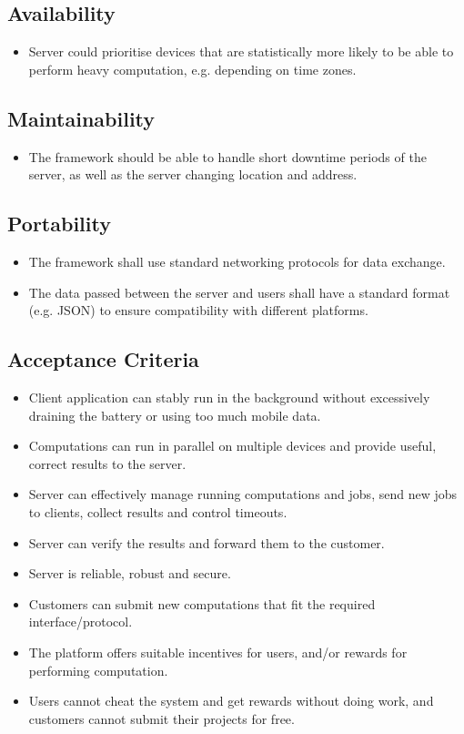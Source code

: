 \documentclass[a4paper,10pt]{article}
\begin{document}
\subsection{Availability}

\begin{itemize}
	\item Server could prioritise devices that are statistically more likely to be able to perform heavy computation, e.g. depending on time zones.

\end{itemize} 

\subsection{Maintainability}

\begin{itemize}
	\item The framework should be able to handle short downtime periods of the server, as well as the server changing location and address.

\end{itemize} 

\subsection{Portability}

\begin{itemize}
	\item The framework shall use standard networking protocols for data exchange.
	\item The data passed between the server and users shall have a standard format (e.g. JSON) to ensure compatibility with different platforms.
\end{itemize} 

\subsection{Acceptance Criteria}

\begin{itemize}
	\item Client application can stably run in the background without excessively draining the battery or using too much mobile data.
	\item Computations can run in parallel on multiple devices and provide useful, correct results to the server.
	\item Server can effectively manage running computations and jobs, send new jobs to clients, collect results and control timeouts.
	\item Server can verify the results and forward them to the customer.
	\item Server is reliable, robust and secure.
	\item Customers can submit new computations that fit the required interface/protocol.
	\item The platform offers suitable incentives for users, and/or rewards for performing computation.
	\item Users cannot cheat the system and get rewards without doing work, and customers cannot submit their projects for free.
\end{itemize}
\end{document}
